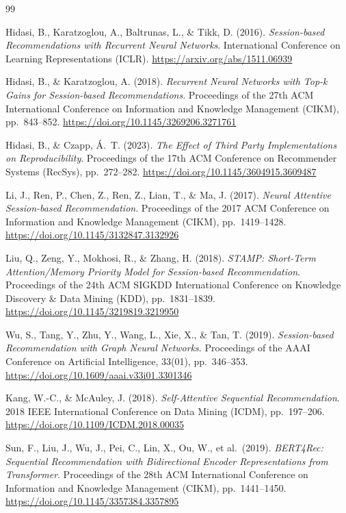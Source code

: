 \documentclass[12pt,a4paper]{report}
\begin{document}
% 
\begin{thebibliography}{99}

Hidasi, B., Karatzoglou, A., Baltrunas, L., \& Tikk, D. (2016).
\textit{Session-based Recommendations with Recurrent Neural Networks}.
International Conference on Learning Representations (ICLR). \url{https://arxiv.org/abs/1511.06939}

Hidasi, B., \& Karatzoglou, A. (2018).
\textit{Recurrent Neural Networks with Top-k Gains for Session-based Recommendations}.
Proceedings of the 27th ACM International Conference on Information and Knowledge Management (CIKM), pp.\ 843--852. \url{https://doi.org/10.1145/3269206.3271761}

Hidasi, B., \& Czapp, \'{A}.~T. (2023).
\textit{The Effect of Third Party Implementations on Reproducibility}.
Proceedings of the 17th ACM Conference on Recommender Systems (RecSys), pp.\ 272--282. \url{https://doi.org/10.1145/3604915.3609487}

Li, J., Ren, P., Chen, Z., Ren, Z., Lian, T., \& Ma, J. (2017).
\textit{Neural Attentive Session-based Recommendation}.
Proceedings of the 2017 ACM Conference on Information and Knowledge Management (CIKM), pp.\ 1419--1428. \url{https://doi.org/10.1145/3132847.3132926}

Liu, Q., Zeng, Y., Mokhosi, R., \& Zhang, H. (2018).
\textit{STAMP: Short-Term Attention/Memory Priority Model for Session-based Recommendation}.
Proceedings of the 24th ACM SIGKDD International Conference on Knowledge Discovery \& Data Mining (KDD), pp.\ 1831--1839. \url{https://doi.org/10.1145/3219819.3219950}

Wu, S., Tang, Y., Zhu, Y., Wang, L., Xie, X., \& Tan, T. (2019).
\textit{Session-based Recommendation with Graph Neural Networks}.
Proceedings of the AAAI Conference on Artificial Intelligence, 33(01), pp.\ 346--353. \url{https://doi.org/10.1609/aaai.v33i01.3301346}

Kang, W.-C., \& McAuley, J. (2018).
\textit{Self-Attentive Sequential Recommendation}.
2018 IEEE International Conference on Data Mining (ICDM), pp.\ 197--206. \url{https://doi.org/10.1109/ICDM.2018.00035}

Sun, F., Liu, J., Wu, J., Pei, C., Lin, X., Ou, W., et al.\ (2019).
\textit{BERT4Rec: Sequential Recommendation with Bidirectional Encoder Representations from Transformer}.
Proceedings of the 28th ACM International Conference on Information and Knowledge Management (CIKM), pp.\ 1441--1450. \url{https://doi.org/10.1145/3357384.3357895}


\end{thebibliography}
\end{document}
